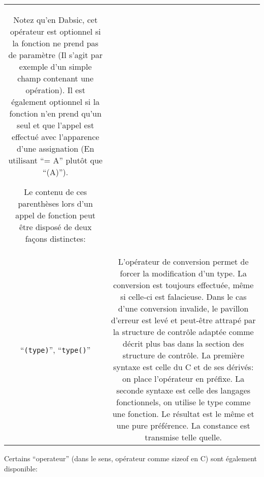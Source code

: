 \documentclass[a5paper, 12pt]{book}
\begin{document}
\begin{tabular}{c|c}
  Notez qu'en Dabsic, cet opérateur est optionnel si la fonction ne prend pas de paramètre
  (Il s'agit par exemple d'un simple champ contenant une opération). Il est également
  optionnel si la fonction n'en prend qu'un seul et que l'appel est effectué avec
  l'apparence d'une assignation (En utilisant ``= A'' plutôt que ``(A)'').

  Le contenu de ces parenthèses lors d'un appel de fonction peut être disposé de deux
  façons distinctes:
%      
  \\
  ``\verb!(type)!'', ``\verb!type()!'' & L'opérateur de conversion permet de forcer la modification
  d'un type. La conversion est toujours effectuée, même si celle-ci est falacieuse.
  Dans le cas d'une conversion invalide, le pavillon d'erreur est levé et peut-être
  attrapé par la structure de contrôle adaptée comme décrit plus bas dans la
  section des structure de contrôle.
  La première syntaxe est celle du C et de ses dérivés: on place l'opérateur en préfixe.
  La seconde syntaxe est celle des langages fonctionnels, on utilise le type comme
  une fonction.
  Le résultat est le même et une pure préférence.
  La constance est transmise telle quelle.\\
  \hline
\end{tabular}

Certains ``operateur'' (dans le sens, opérateur comme sizeof en C) sont également
disponible:
\end{document}
